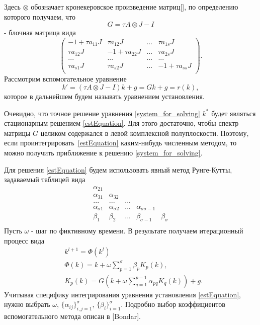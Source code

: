 \documentclass[a4paper,12pt]{report}
\begin{document}
Здесь $\otimes$ обозначает кронекеровское произведение матриц[], по
определению которого получаем, что $$G=\tau A\otimes J-I$$ - блочная
матрица вида
	\begin{equation}
	\left(
	\begin{array}{llll}
	-1+\tau a_{11}J& \tau a_{12}J&...&\tau a_{1s}J\\
 	\tau a_{12}J&-1+\tau a_{22}J&...&\tau a_{2s}J\\
	...&...&...&...\\
	\tau a_{s1}J& \tau a_{s2}J&...&-1+\tau a_{ss}J\\
	\end{array}
	\right ).
	\end{equation}
Рассмотрим вспомогательное уравнение
	\begin{equation}
	\label{estEquation}
	k'=(\tau A\otimes J-I)k+g=Gk+g = r(k),
	\end{equation}
которое в дальнейшем будем называть уравнением установления.

Очевидно, что точное решение уравнения \eqref{system_for_solving} $k^*$ будет являться стационарным решением \eqref{estEquation}. Для этого достаточно, чтобы спектр матрицы $G$ целиком содержался в левой комплексной полуплоскости. Поэтому, если проинтегрировать~\eqref{estEquation}  каким-нибудь численным методом, то можно получить приближение к решению \eqref{system_for_solving}.

Для решения \eqref{estEquation} будем использовать явный метод Рунге-Кутты, задаваемый таблицей вида
	\begin{equation}
	\label{auxilary_method_table}
	\begin{array}{lllll}
	 \alpha_{21}& & & &  \\
	 \alpha_{31}&\alpha_{32} & & &  \\
	 ...& ...& ...& &\\
	 \alpha_{\sigma1}& \alpha_{\sigma2}&... &\alpha_{\sigma\sigma-1}&  \\
	\hline
	 \beta_1&\beta_2 &...&\beta_{\sigma-1}& \beta_\sigma\\
	\end{array}
	\end{equation}
Пусть $\omega$ - шаг по фиктивному времени. В результате получаем итерационный процесс вида
	\begin{equation}\label{ipe_gf}
	\begin{aligned}
	&k^{l+1}=\Phi(k^{l})\\
	&\Phi(k)=k+\omega \sum_{p=1}^\sigma\beta_pK_p(k),\\
	&K_p(k)=G (k +\omega\sum_{q=1}^{p-1}\alpha_{pq} K_q(k))+g.
	\end{aligned}
	\end{equation}
Учитывая специфику интегрирования уравнения установления \eqref{estEquation}, нужно выбрать  $\omega$, $\{\alpha_{ij}\}_{i,j=1}^{\sigma}$, $\{\beta_i\}_{i=1}^{\sigma}$. Подробно выбор коэффициентов вспомогательного метода описан в [Bondar].
  
\end{document}
